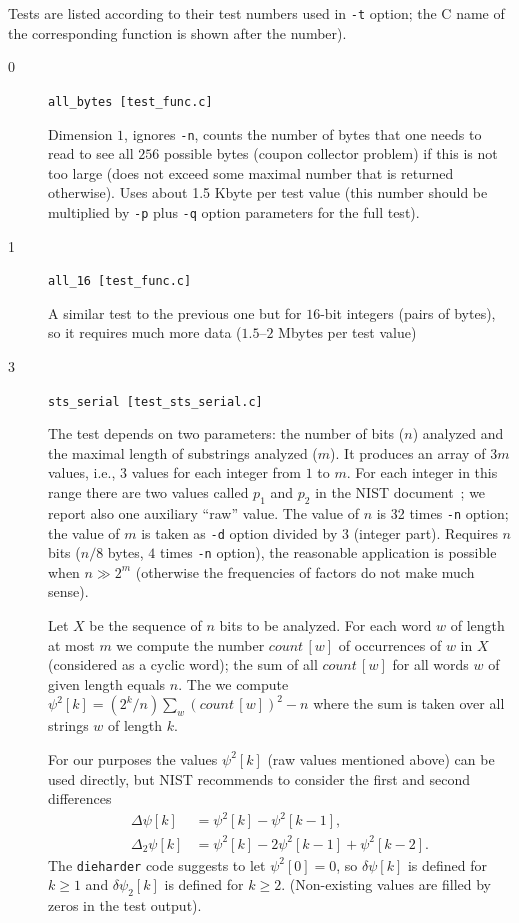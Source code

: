\documentclass[12pt,a4paper,fullpage]{article}
\begin{document}
Tests are listed according to their test numbers used in \texttt{-t} option; the C name of the corresponding function is shown after the number).

\begin{description}

\item[0] \texttt{all\_bytes [test\_func.c]}

Dimension $1$, ignores \texttt{-n}, counts the number of bytes that one needs to read to see all $256$ possible bytes (coupon collector problem) if this is not too large (does not exceed some maximal number that is returned otherwise). Uses about 1.5 Kbyte per test value (this number should be multiplied by \texttt{-p} plus \texttt{-q} option parameters for the full test).

\item[1] \texttt{all\_16 [test\_func.c]}

A similar test to the previous one but for $16$-bit integers (pairs of bytes), so it requires much more data ($1.5$--$2$ Mbytes per test value)

\item[3] \texttt{sts\_serial [test\_sts\_serial.c]}

The test depends on two parameters: the number of bits ($n$) analyzed and the maximal length of substrings analyzed ($m$). It produces an array of $3m$ values, i.e., $3$ values for each  integer from $1$ to $m$. For each integer in this range there are two values called $p_1$ and $p_2$ in the NIST document~\cite{nistsp800-22-1a}; we report also one auxiliary ``raw'' value. The value of $n$ is 32 times \texttt{-n} option; the value of $m$ is taken as \texttt{-d} option divided by $3$ (integer part). Requires $n$ bits ($n/8$ bytes, $4$ times \texttt{-n} option), the reasonable application is possible when $n\gg 2^m$ (otherwise the frequencies of factors do not make much sense). 

Let $X$ be the sequence of $n$ bits to be analyzed. For each word $w$ of length at most $m$ we compute the number $\textit{count}\,[w]$ of occurrences of $w$ in $X$ (considered as a cyclic word); the sum of all $\textit{count}\,[w]$ for all words $w$ of given length equals $n$. The we compute $\psi^2[k] = (2^{k}/n)\sum_w (\textit{count}\,[w])^2 - n$ where the sum is taken over all strings $w$ of length $k$.
 
For our purposes the values $\psi^2[k]$ (raw values mentioned above) can be used directly, but NIST
 recommends to consider the first and second differences
\begin{align*}
   \Delta\psi[k] &= \psi^2[k] - \psi^2[k-1],\\
   \Delta_2\psi[k] &= \psi^2[k] - 2\psi^2[k-1] + \psi^2[k-2].
\end{align*}   
The \texttt{dieharder} code suggests to let $\psi^2[0]=0$, so $\delta\psi[k]$ is defined for $k\ge1$ and $\delta\psi_2[k]$ is defined for $k\ge2$. (Non-existing values are filled by zeros in the test output).  
 

\end{description}
\end{document}
